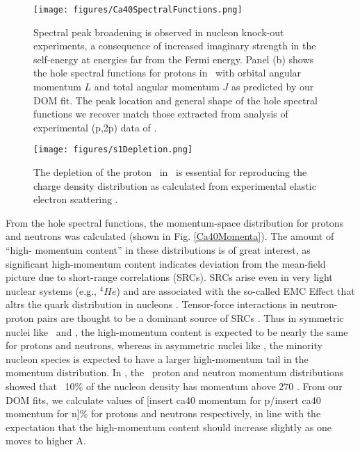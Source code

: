 \begin{figure}[tb]
    \centering
    \texttt{[image: figures/Ca40SpectralFunctions.png]}
    \caption[Spectral peak broadening in \caForty: DOM prediction and experimental (p,2p) data]
    {
        Spectral peak broadening is observed in nucleon knock-out experiments, a 
        consequence of increased imaginary strength in the self-energy at energies far from the
        Fermi energy. Panel (b) shows the hole spectral functions for
        protons in \caForty\ with orbital angular momentum $L$ and
        total angular momentum $J$ as predicted by our DOM fit.
        The peak location and general shape of the hole spectral functions we recover match those
        extracted from analysis of experimental (p,2p) data of \cite{LiverpoolCa40}.
    }
    \label{Ca40SpectralFunctions}
\end{figure}

\begin{figure}[tb]
    \centering
    \texttt{[image: figures/s1Depletion.png]}
    \caption[Depletion of proton \sOne\ in \caForty essential to reproduce charge density
    distribution]
    {
        The depletion of the proton \sOne\ in \caForty\ is essential
        for reproducing the charge density
        distribution as calculated from experimental elastic electron scattering \cite{DeVries1987}.
    }
    \label{s1Depletion}
\end{figure}

From the hole spectral functions, the momentum-space distribution for protons and neutrons was
calculated (shown in Fig. \ref{Ca40Momenta}). The amount of ``high-
momentum content'' in these distributions is of great interest, as significant high-momentum content 
indicates deviation from the mean-field picture due to short-range correlations (SRCs). SRCs arise 
even in very light nuclear systems (e.g., $^{4}He$)
and are associated with the so-called EMC Effect that altrs the quark distribution in nucleons 
\cite{Hen2012, Arrington2012, CLAS2019}.
Tensor-force interactions in neutron-proton pairs are thought to be a dominant source of 
SRCs \cite{Subedi2008}. Thus in symmetric nuclei like \cTwelve\ and \caForty, the
high-momentum content is expected to be nearly the same for protons and neutrons, whereas in
asymmetric nuclei like \pbEight, the minority nucleon species is expected to have a larger
high-momentum tail in the momentum distribution. In \cite{Rohe2004}, the \cTwelve\ proton and
neutron momentum distributions showed that ~10\% of the nucleon density
has momentum above 270 \mega\electronvolt{}.
From our DOM fits, we calculate values of [insert ca40 momentum for p/insert ca40 momentum for n]\%
for protons and neutrons respectively, in line with the expectation that the high-momentum content
should increase slightly as one moves to higher A.

